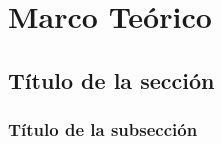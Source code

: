 \chapter{Marco Teórico}

 \section {Título de la sección}
 
 
\subsection{Título de la subsección}



 